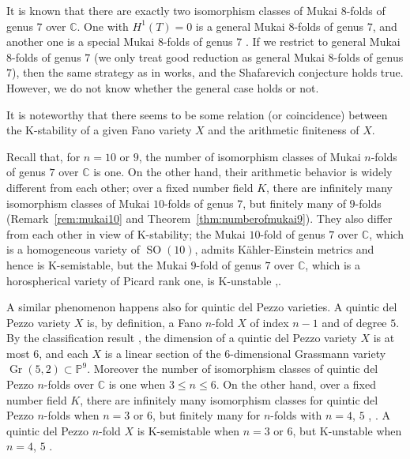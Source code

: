 \documentclass[autodetect-engine, a4paper]{amsart}
\theoremstyle{definition}
\def\P{{\mathbb P}}
\def\C{{\mathbb C}}
\DeclareMathOperator\SO{\mathrm{SO}}
\DeclareMathOperator\Gr{\mathrm{Gr}}
\begin{document}
\medskip
{}
It is known that
there are exactly two isomorphism classes of Mukai $8$-folds of genus $7$ over $\C$.
One with $H^1(T) =0$ is a general Mukai $8$-folds of genus $7$, and another one is a special Mukai $8$-folds of genus $7$ \cite{Kuznetsovspinor}.
If we restrict to general Mukai $8$-folds of genus $7$ (we only treat good reduction as general Mukai $8$-folds of genus $7$), then the same strategy as in \cite[Proposition 4.10]{Javanpeykar-Loughran:GoodReductionFano} works, and the Shafarevich conjecture holds true.
However, we do not know whether the general case holds or not.


\medskip
{}
It is noteworthy that there seems to be some relation (or coincidence) between the K-stability of a given Fano variety $X$ and the arithmetic finiteness of $X$.

Recall that, for $n=10$ or $9$, the number of isomorphism classes of Mukai $n$-folds of genus $7$ over $\C$ is one.
On the other hand, their arithmetic behavior is widely different from each other;
over a fixed number field $K$, there are infinitely many isomorphism classes of Mukai $10$-folds of genus $7$, but finitely many of $9$-folds (Remark~\ref{rem:mukai10} and Theorem~\ref{thm:numberofmukai9}).
They also differ from each other in view of K-stability;
the Mukai $10$-fold of genus $7$ over $\C$, which is a homogeneous variety of $\SO(10)$, admits K\"ahler-Einstein metrics and hence is K-semistable, but the Mukai $9$-fold of genus $7$ over $\C$, which is a horospherical variety of Picard rank one, is K-unstable \cite{Mat72},\cite[\S 5.4.1]{Del20}.

A similar phenomenon happens also for quintic del Pezzo varieties.
A quintic del Pezzo variety $X$ is, by definition, a Fano $n$-fold $X$ of index $n-1$ and of degree $5$.
By the classification result \cite{Fuj90}, the dimension of a quintic del Pezzo variety $X$ is at most $6$, and each $X$ is a linear section of the $6$-dimensional Grassmann variety $\Gr(5,2) \subset \P^9$.
Moreover the number of isomorphism classes of quintic del Pezzo $n$-folds over $\C$ is one when $3 \leq n \leq 6$.
On the other hand, over a fixed number field $K$, there are infinitely many isomorphism classes for quintic del Pezzo $n$-folds when $n=3$ or $6$, but finitely many for $n$-folds with $n =4$, $5$  \cite{DKM}, \cite[\S 2.2]{DK19}.
A quintic del Pezzo $n$-fold $X$ is K-semistable when $n=3$ or $6$, but K-unstable when $n=4$, $5$ \cite{Fuj17}.
\end{document}
